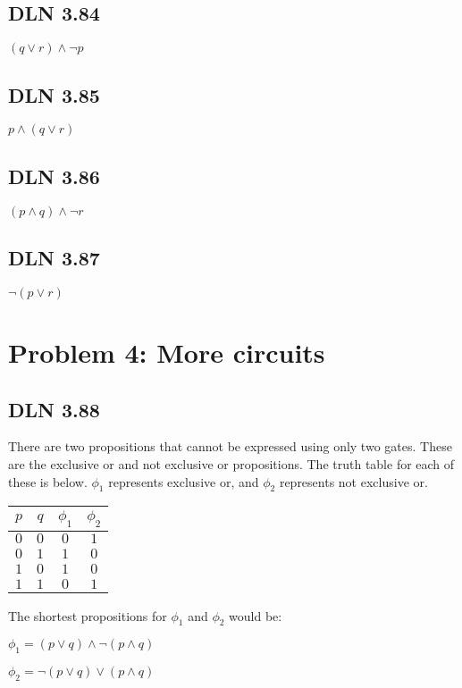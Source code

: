 \documentclass[titlepage]{article}
\begin{document}
\subsection{DLN 3.84} 

\( (q \lor r) \land \lnot p \)

\subsection{DLN 3.85} 

\( p \land (q \lor r) \)

\subsection{DLN 3.86} 

\( (p \land q) \land \lnot r \)

\subsection{DLN 3.87} 

\( \lnot (p \lor r) \)

\section{Problem 4: More circuits}

\subsection{DLN 3.88} 

There are two propositions that cannot be expressed using only two gates. These are the exclusive or and not exclusive or propositions. The truth table for each of these is below. $\phi _1$ represents exclusive or, and $\phi _2$ represents not exclusive or.

\begin{center}
\begin{tabular}{c c|c|c}
\textbf{$p$} & \textbf{$q$} & \textbf{$\phi _1$} & \textbf{$\phi _2$} \\ \hline
\(0\) & \(0\) & \(0\) & \(1\) \\
\(0\) & \(1\) & \(1\) & \(0\) \\
\(1\) & \(0\) & \(1\) & \(0\) \\
\(1\) & \(1\) & \(0\) & \(1\) \\
\end{tabular}
\end{center}

The shortest propositions for $\phi _1$ and $\phi _2$ would be:

\( \phi _1 = (p \lor q) \land \lnot(p \land q)\)

\( \phi _2 = \lnot (p \lor q) \lor (p \land q)\)
\end{document}
